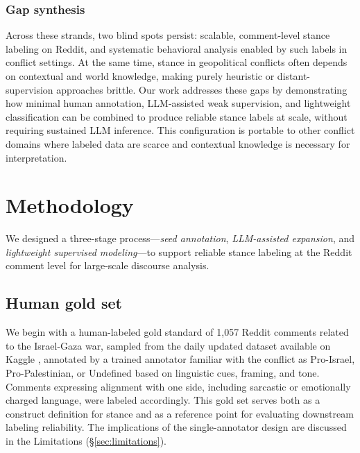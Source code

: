 \documentclass[letterpaper]{article} %
\begin{document}
\subsubsection{Gap synthesis}

Across these strands, two blind spots persist: scalable, comment-level stance labeling on Reddit, and systematic behavioral analysis enabled by such labels in conflict settings. At the same time, stance in geopolitical conflicts often depends on contextual and world knowledge, making purely heuristic or distant-supervision approaches brittle. Our work addresses these gaps by demonstrating how minimal human annotation, LLM-assisted weak supervision, and lightweight classification can be combined to produce reliable stance labels at scale, without requiring sustained LLM inference. This configuration is portable to other conflict domains where labeled data are scarce and contextual knowledge is necessary for interpretation.


\section{Methodology}
\label{sec:methodology}

We designed a three-stage process---\emph{seed annotation}, \emph{LLM-assisted expansion}, and \emph{lightweight supervised modeling}---to support reliable stance labeling at the Reddit comment level for large-scale discourse analysis.

\subsection{Human gold set}
We begin with a human-labeled gold standard of 1{,}057 Reddit comments related to the Israel-Gaza war, sampled from the daily updated dataset available on Kaggle \cite{asaniczka_2024}, annotated by a trained annotator familiar with the conflict as Pro-Israel, Pro-Palestinian, or Undefined based on linguistic cues, framing, and tone. Comments expressing alignment with one side, including sarcastic or emotionally charged language, were labeled accordingly. This gold set serves both as a construct definition for stance and as a reference point for evaluating downstream labeling reliability. The implications of the single-annotator design are discussed in the Limitations (\S\ref{sec:limitations}).
\end{document}
